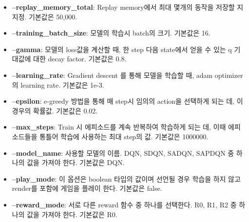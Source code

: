 \begin{itemize}
	\item \textbf{--replay\_memory\_total}:
		Replay memory에서 최대 몇개의 동작을 저장할 지 지정.
		기본값은 50,000.
	\item \textbf{--training\_batch\_size}:
		모델의 학습시 batch의 크기.
		기본값은 16.
	\item \textbf{--gamma}:
		모델의 loss값을 계산할 때, 한 step 다음 state에서 얻을 수 있는 q 기대값에 대한 decay factor.
		기본값은 0.8.
	\item \textbf{--learning\_rate}:
		Gradient descent 를 통해 모델을 학습할 때, adam optimizer의 learning rate.
		기본값은 1e-3.
	\item \textbf{--epsilon}:
		e-greedy 방법을 통해 매 step시 임의의 action을 선택하게 되는 데, 이 경우의 확률값.
		기본값은 0.02.
	\item \textbf{--max\_steps}:
		Train 시 에피소드를 계속 반복하여 학습하게 되는 데, 이때 에피소드들을 통틀어 학습에 사용하는 최대 step의 값.
		기본값은 1000000.
	\item \textbf{--model\_name}:
		사용할 모델의 이름. DQN, SDQN, SADQN, SAPDQN 중 하나의 값을 가져야 한다.
		기본값은 DQN.
	\item \textbf{--play\_mode}:
		이 옵션은 boolean 타입의 값이며 선언될 경우 학습을 하지 않고 render를 포함에 게임을 플레이 한다.
		기본값은 false.
	\item \textbf{--reward\_mode}:
		서로 다른 reward 함수 중 하나를 선택한다. R0, R1, R2 중 하나의 값을 가져야 한다.
		기본값은 R0.
\end{itemize}
%

